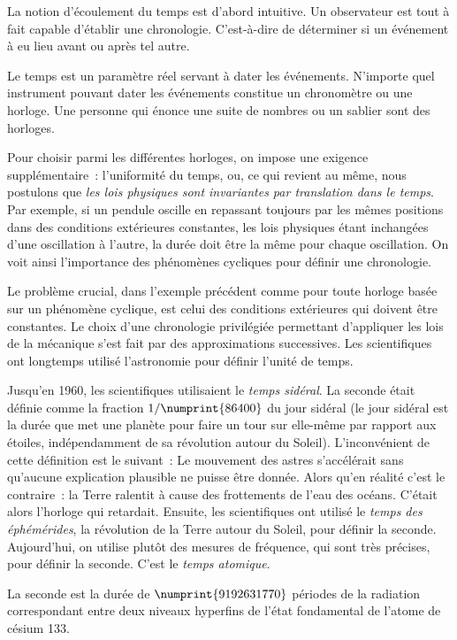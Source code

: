 La notion d'écoulement du temps est d'abord intuitive. Un observateur est tout à fait capable d'établir une chronologie. C'est-à-dire de déterminer si un événement à eu lieu avant ou après tel autre.

Le temps est un paramètre réel servant à dater les événements. N'importe quel instrument pouvant dater les événements constitue un chronomètre ou une horloge. Une personne qui énonce une suite de nombres ou un sablier sont des horloges.

Pour choisir parmi les différentes horloges, on impose une exigence supplémentaire~: l'uniformité du temps, ou, ce qui revient au même, nous postulons que \emph{les lois physiques sont invariantes par translation dans le temps}. Par exemple, si un pendule oscille en repassant toujours par les mêmes positions dans des conditions extérieures constantes, les lois physiques étant inchangées d'une oscillation à l'autre, la durée doit être la même pour chaque oscillation. On voit ainsi l'importance des phénomènes cycliques pour définir une chronologie.

Le problème crucial, dans l'exemple précédent comme pour toute horloge basée sur un phénomène cyclique, est celui des conditions extérieures qui doivent être constantes. Le choix d'une chronologie privilégiée permettant d'appliquer les lois de la mécanique s'est fait par des approximations successives. Les scientifiques ont longtemps utilisé l'astronomie pour définir l'unité de temps. 

Jusqu'en 1960, les scientifiques utilisaient le \emph{temps sidéral}. La seconde était définie comme la fraction $1/\numprint{86400}$ du jour sidéral (le jour sidéral est la durée que met une planète pour faire un tour sur elle-même par rapport aux étoiles, indépendamment de sa révolution autour du Soleil). L'inconvénient de cette définition est le suivant~: Le mouvement des astres s'accélérait sans qu'aucune explication plausible ne puisse être donnée. Alors qu'en réalité c'est le contraire~: la Terre ralentit à cause des frottements de l'eau des océans. C'était alors l'horloge qui retardait. Ensuite, les scientifiques ont utilisé le \emph{temps des éphémérides}, la révolution de la Terre autour du Soleil, pour définir la seconde. Aujourd'hui, on utilise plutôt des mesures de fréquence, qui sont très précises, pour définir la seconde. C'est le \emph{temps atomique}.
\begin{defdef}
  La seconde est la durée de $\numprint{9192631770}$ périodes de la radiation correspondant entre deux niveaux hyperfins de l'état fondamental de l'atome de césium 133.
\end{defdef}

